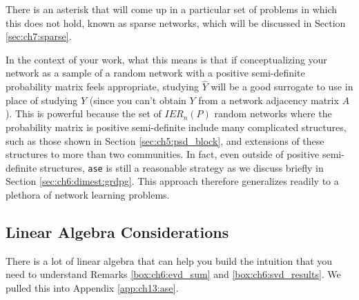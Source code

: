 There is an asterisk that will come up in a particular set of problems in which this does not hold, known as sparse networks, which will be discussed in Section \ref{sec:ch7:sparse}.

In the context of your work, what this means is that if conceptualizing your network as a sample of a random network with a positive semi-definite probability matrix feels appropriate, studying $\hat Y$ will be a good surrogate to use in place of studying $Y$ (since you can't obtain $Y$ from a network adjacency matrix $A$). This is powerful because the set of $IER_n(P)$ random networks where the probability matrix is positive semi-definite include many complicated structures, such as those shown in Section \ref{sec:ch5:psd_block}, and extensions of these structures to more than two communities. In fact, even outside of positive semi-definite structures, \texttt{ase} is still a reasonable strategy as we discuss briefly in Section \ref{sec:ch6:dimest:grdpg}. This approach therefore generalizes readily to a plethora of network learning problems. 

\subsection{Linear Algebra Considerations}

There is a lot of linear algebra that can help you build the intuition that you need to understand Remarks \ref{box:ch6:evd_sum} and \ref{box:ch6:svd_results}. We pulled this into Appendix \ref{app:ch13:ase}.

\newpage